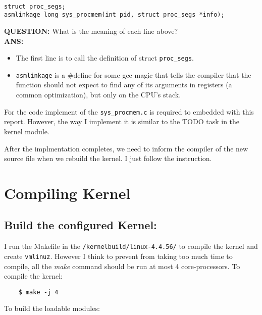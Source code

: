 \documentclass[a4paper, 11pt]{article}
\begin{document}
\bigbreak
\begin{verbatim}

struct proc_segs;
asmlinkage long sys_procmem(int pid, struct proc_segs *info);

\end{verbatim}

\bigbreak
\textbf{QUESTION:} What is the meaning of each line above? \\
\textbf{ANS:}
\begin{itemize}
    \item The first line is to call the definition of struct \texttt{proc\_segs}.
    \item \texttt{asmlinkage} is a \#define for some gcc magic that tells the compiler that the function should not expect to find any of its arguments in registers (a common optimization), but only on the CPU's stack. 
\end{itemize}

\par{For the code implement of the \texttt{sys\_procmem.c} is required to embedded with this report. However, the way I implement it is similar to the TODO task in the kernel module.}

\par{After the implmentation completes, we need to inform the compiler of the new source file when we rebuild the kernel. I just follow the instruction.}

\section{Compiling Kernel}

\subsection{Build the configured Kernel:}

\par{I run the Makefile in the \texttt{/kernelbuild/linux-4.4.56/} to compile the kernel and create \texttt{vmlinuz}. However I think to prevent from taking too much time to compile, all the \textit{make} command should be run at most 4 core-processors. To compile the kernel:}

\begin{verbatim}
    $ make -j 4
\end{verbatim}

\par{To build the loadable modules:}
\end{document}
